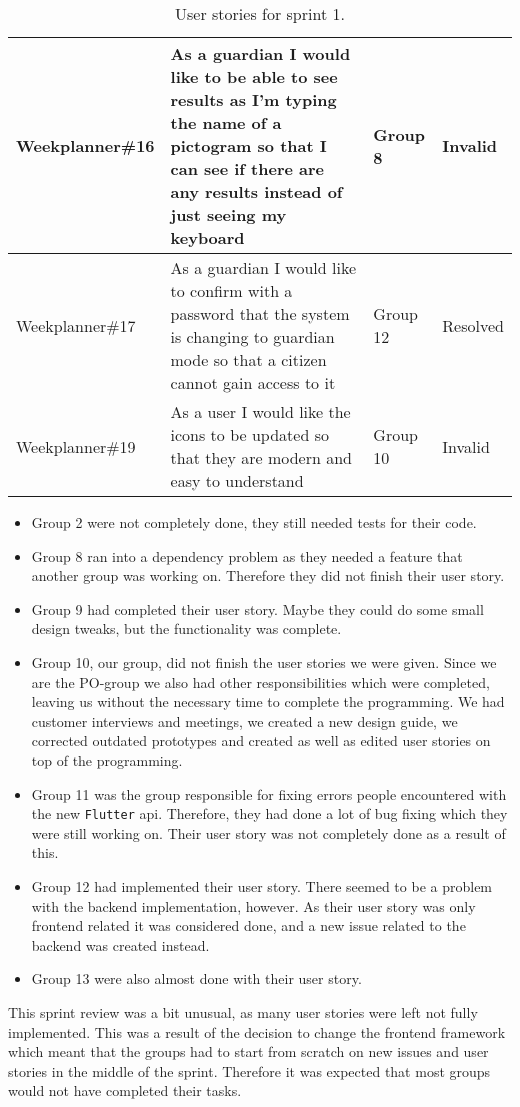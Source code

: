 \begin{table}[!ht]
\begin{tabular}{|p{2.8cm}|p{7cm}|p{2cm}|p{1.5cm}|}
    Weekplanner\#16 & As a guardian I would like to be able to see results as I'm typing the name of a pictogram so that I can see if there are any results instead of just seeing my keyboard & Group 8         & Invalid    \\ \hline
    Weekplanner\#17 & As a guardian I would like to confirm with a password that the system is changing to guardian mode so that a citizen cannot gain access to it                            & Group 12        & Resolved   \\ \hline
    Weekplanner\#19 & As a user I would like the icons to be updated so that they are modern and easy to understand                                                                            & Group 10        & Invalid    \\ \hline
    \end{tabular}
    \caption{User stories for sprint 1.}
\end{table}

\begin{itemize}
    \item Group 2 were not completely done, they still needed tests for their code.
    \item Group 8 ran into a dependency problem as they needed a feature that another group was working on. Therefore they did not finish their user story.
    \item Group 9 had completed their user story. Maybe they could do some small design tweaks, but the functionality was complete.
    \item Group 10, our group, did not finish the user stories we were given. Since we are the PO-group we also had other responsibilities which were completed, leaving us without the necessary time to complete the programming. We had customer interviews and meetings, we created a new design guide, we corrected outdated prototypes and created as well as edited user stories on top of the programming.
    \item Group 11 was the group responsible for fixing errors people encountered with the new \texttt{Flutter} api. Therefore, they had done a lot of bug fixing which they were still working on. Their user story was not completely done as a result of this.
    \item Group 12 had implemented their user story. There seemed to be a problem with the backend implementation, however. As their user story was only frontend related it was considered done, and a new issue related to the backend was created instead.
    \item Group 13 were also almost done with their user story.
\end{itemize}
\noindent
This sprint review was a bit unusual, as many user stories were left not fully implemented. This was a result of the decision to change the frontend framework which meant that the groups had to start from scratch on new issues and user stories in the middle of the sprint.
Therefore it was expected that most groups would not have completed their tasks.
